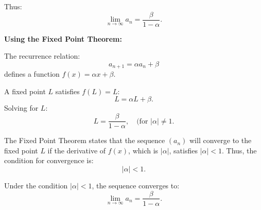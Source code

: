 \documentclass[12pt]{article}
\begin{document}
\begin{enumerate}
Thus:
\[
\lim_{n \to \infty} a_n = \frac{\beta}{1 - \alpha}.
\]

\textbf{Using the Fixed Point Theorem:}

The recurrence relation:
\[
a_{n+1} = \alpha a_n + \beta
\]
defines a function \(f(x) = \alpha x + \beta\).

A fixed point \(L\) satisfies \(f(L) = L\):
\[
L = \alpha L + \beta.
\]
Solving for \(L\):
\[
L = \frac{\beta}{1 - \alpha}, \quad \text{(for \(|\alpha| \neq 1\)}.
\]

The Fixed Point Theorem states that the sequence \((a_n)\) will converge to the fixed point \(L\) if the derivative of \(f(x)\), which is \(|\alpha|\), satisfies \(|\alpha| < 1\). Thus, the condition for convergence is:
\[
|\alpha| < 1.
\]

Under the condition \(|\alpha| < 1\), the sequence converges to:
\[
\lim_{n \to \infty} a_n = \frac{\beta}{1 - \alpha}.
\]


\end{enumerate}
\end{document}
